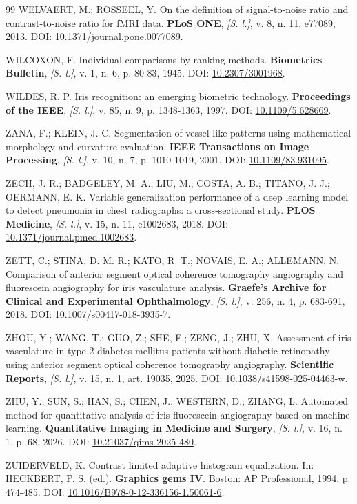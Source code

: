 \documentclass[12pt, oneside, a4paper, chapter=TITLE, section=TITLE,
               english, brazil]{abntex2}
\newcommand{\doi}[1]{DOI: \href{https://doi.org/#1}{#1}}
\newcommand{\semlocal}{\textit{[S. l.]}}
\begin{document}
\begin{thebibliography}{99}
WELVAERT, M.; ROSSEEL, Y. On the definition of signal-to-noise ratio and
contrast-to-noise ratio for fMRI data. \textbf{PLoS ONE}, \semlocal, v. 8,
n. 11, e77089, 2013. \doi{10.1371/journal.pone.0077089}.

WILCOXON, F. Individual comparisons by ranking methods. \textbf{Biometrics
Bulletin}, \semlocal, v. 1, n. 6, p. 80-83, 1945. \doi{10.2307/3001968}.

WILDES, R. P. Iris recognition: an emerging biometric technology.
\textbf{Proceedings of the IEEE}, \semlocal, v. 85, n. 9, p. 1348-1363, 1997.
\doi{10.1109/5.628669}.

ZANA, F.; KLEIN, J.-C. Segmentation of vessel-like patterns using
mathematical morphology and curvature evaluation. \textbf{IEEE Transactions
on Image Processing}, \semlocal, v. 10, n. 7, p. 1010-1019, 2001.
\doi{10.1109/83.931095}.

ZECH, J. R.; BADGELEY, M. A.; LIU, M.; COSTA, A. B.; TITANO, J. J.;
OERMANN, E. K. Variable generalization performance of a deep learning model
to detect pneumonia in chest radiographs: a cross-sectional study.
\textbf{PLOS Medicine}, \semlocal, v. 15, n. 11, e1002683, 2018.
\doi{10.1371/journal.pmed.1002683}.

ZETT, C.; STINA, D. M. R.; KATO, R. T.; NOVAIS, E. A.; ALLEMANN, N.
Comparison of anterior segment optical coherence tomography angiography and
fluorescein angiography for iris vasculature analysis. \textbf{Graefe's
Archive for Clinical and Experimental Ophthalmology}, \semlocal, v. 256,
n. 4, p. 683-691, 2018. \doi{10.1007/s00417-018-3935-7}.

ZHOU, Y.; WANG, T.; GUO, Z.; SHE, F.; ZENG, J.; ZHU, X. Assessment of iris
vasculature in type 2 diabetes mellitus patients without diabetic retinopathy
using anterior segment optical coherence tomography angiography.
\textbf{Scientific Reports}, \semlocal, v. 15, n. 1, art. 19035, 2025.
\doi{10.1038/s41598-025-04463-w}.

ZHU, Y.; SUN, S.; HAN, S.; CHEN, J.; WESTERN, D.; ZHANG, L. Automated method
for quantitative analysis of iris fluorescein angiography based on machine
learning. \textbf{Quantitative Imaging in Medicine and Surgery}, \semlocal,
v. 16, n. 1, p. 68, 2026. \doi{10.21037/qims-2025-480}.

ZUIDERVELD, K. Contrast limited adaptive histogram equalization. In:
HECKBERT, P. S. (ed.). \textbf{Graphics gems IV}. Boston: AP Professional,
1994. p. 474-485. \doi{10.1016/B978-0-12-336156-1.50061-6}.

\end{thebibliography}
\end{document}
